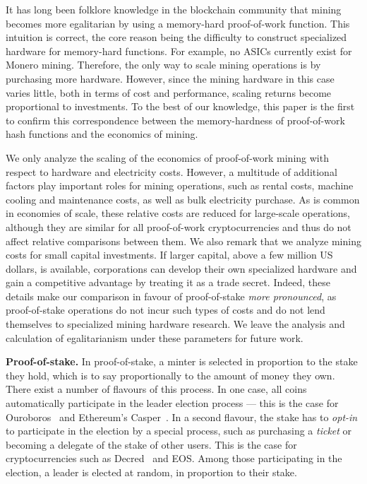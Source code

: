 It has long been folklore knowledge in the blockchain community that mining
becomes more egalitarian by using a memory-hard proof-of-work function. This
intuition is correct, the core reason being the difficulty to construct
specialized hardware for memory-hard functions. For example, no ASICs
currently exist for Monero mining.  Therefore, the only way to scale mining
operations is by purchasing more hardware. However, since the mining hardware
in this case varies little, both in terms of cost and performance, scaling
returns become proportional to investments.  To the best of our knowledge, this
paper is the first to confirm this correspondence between the
memory-hardness of proof-of-work hash functions and the economics of mining.

\begin{remark}\label{rmk:pow-scale}
We only analyze the scaling of the economics of proof-of-work mining with
respect to hardware and electricity costs. However, a multitude of
additional factors play important roles for mining operations, such as
rental costs, machine cooling and maintenance costs, as well as bulk
electricity purchase.  As is common in economies of scale, these relative
costs are reduced for large-scale operations, although they are similar for
all proof-of-work cryptocurrencies and thus do not affect relative
comparisons between them. We also remark that we analyze mining costs for
small capital investments. If larger capital, \eg above a few million US
dollars, is available, corporations can develop their own specialized
hardware and gain a competitive advantage by treating it as a trade secret.
Indeed, these details make our comparison in favour of proof-of-stake
\emph{more pronounced}, as proof-of-stake operations do not incur such
types of costs and do not lend themselves to specialized mining hardware
research. We leave the analysis and calculation of egalitarianism under
these parameters for future work.
\end{remark}

\noindent\textbf{Proof-of-stake.}
In proof-of-stake, a minter is selected in proportion to the stake they hold,
which is to say proportionally to the amount of money they own. There exist a
number of flavours of this process. In one case, all coins automatically
participate in the leader election process --- this is the case for Ouroboros~\cite{C:KRDO17} and
Ethereum's Casper~\cite{buterin2017casper}. In a second flavour, the stake has
to \emph{opt-in} to participate in the election by a special process, such as
purchasing a \emph{ticket} or becoming a delegate of the stake of other users.
This is the case for cryptocurrencies such as Decred~\cite{decred} and EOS. Among those
participating in the election, a leader is elected at random, in proportion to
their stake.

